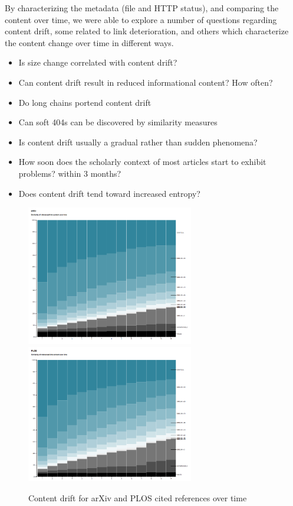 \documentclass[12pt]{article}
\begin{document}
By characterizing the metadata (file and HTTP status), and comparing the content over time, we were able to explore a number of questions regarding content drift, some related to link deterioration, and others which characterize the content change over time in different ways.

\begin{itemize}
\item Is size change correlated with content drift?
\item Can content drift result in reduced informational content? How often?
\item Do long chains portend content drift
\item Can soft 404s can be discovered by similarity measures
\item Is content drift usually a gradual rather than sudden phenomena?
\item How soon does the scholarly context of most articles start to exhibit problems? within 3 months?
\item Does content drift tend toward increased entropy?
\end{itemize}

\begin{figure}[ht!]
  \includegraphics[width=0.65\textwidth]{figure7_a.png}
  \includegraphics[width=0.65\textwidth]{figure7_b.png}
  \caption{Content drift for arXiv and PLOS cited references over time }
  \label{fig:cdarxivplos}
\end{figure}
\end{document}
